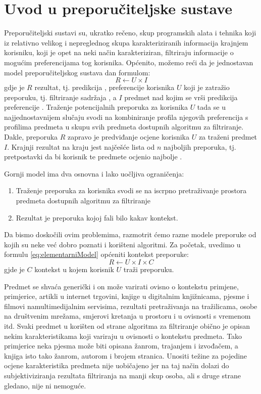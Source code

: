 \documentclass[times, utf8, diplomski, numeric]{fer}
\begin{document}
\section{Uvod u preporučiteljske sustave}
Preporučiteljski sustavi su, ukratko rečeno, skup programskih alata i tehnika
koji iz relativno velikog i nepreglednog skupa karakteriziranih informacija
krajnjem korisniku, koji je opet na neki način karakteriziran, filtriraju
informacije o mogućim preferencijama tog korisnika. Općenito, možemo reći da je
jednostavan model preporučiteljskog sustava dan formulom:
\begin{equation}
\label{eq:elementarniModel}
	R \leftarrow U \times I
\end{equation}
gdje je $R$ rezultat, tj. predikcija ,
preferencije korisnika $U$  koji je zatražio preporuku, tj.
filtriranje sadržaja , a $I$ predmet nad kojim se vrši predikcija preferencije
. Traženje potencijalnih preporuka za korisnika $U$ tada se u
najjednostavnijem slučaju svodi na kombiniranje profila njegovih preferencija s
profilima predmeta u skupu svih predmeta dostupnih algoritmu za filtriranje.
Dakle, preporuka $R$ zapravo je predviđanje ocjene korisnika $U$ za
traženi predmet $I$. Krajnji rezultat na kraju jest najčešće lista od $n$
najboljih preporuka, tj. pretpostavki da bi korisnik te predmete ocjenio
najbolje . 

Gornji model ima dva osnovna i lako uočljiva ograničenja:
\begin{enumerate}
  \item Traženje preporuka za korisnika svodi se na iscrpno pretraživanje
  prostora predmeta dostupnih algoritmu za filtriranje
  \item Rezultat je preporuka kojoj fali bilo kakav kontekst.
\end{enumerate}

Da bismo doskočili ovim problemima, razmotrit ćemo razne modele preporuke od
kojih su neke već dobro poznati i korišteni algoritmi. Za početak, uvedimo u
formulu \ref{eq:elementarniModel} općeniti kontekst preporuke:
\begin{equation}
\label{eq:elementarniModelSKontekstom}
	R \leftarrow U \times I \times C
\end{equation}
gjde je $C$ kontekst u kojem korisnik $U$ traži preporuku.

Predmet se shvaća generički i on može varirati ovisno o kontekstu primjene,
primjerice, artikli u internet trgovini, knjige u digitalnim knjižnicama, pjesme
i filmovi namultimedijalnim servisima, rezultati pretraživanja na tražilicama,
osobe na društvenim mrežama, smjerovi kretanja u prostoru i u ovisnosti s
vremenom itd. Svaki predmet u korišten od strane algoritma za filtriranje obično
je opisan nekim karakteristikama koji variraju u ovisnosti o kontekstu predmeta.
Tako primjerice neka pjesma može biti opisana žanrom, trajanjem i izvođačem, a
knjiga isto tako žanrom, autorom i brojem stranica. Unositi težine za pojedine
ocjene karakteristika predmeta nije uobičajeno jer na taj način dolazi do
subjektiviziranja rezultata filtriranja na manji skup osoba, ali s druge strane
gledano, nije ni nemoguće.
\end{document}
